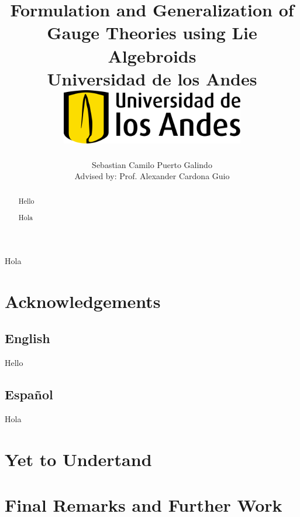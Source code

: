 \documentclass[12pt]{report}
\title 
{
	{Formulation and Generalization of Gauge Theories using Lie Algebroids}\\
	{\large Universidad de los Andes}\\
	\vspace{1.5cm}
	{\includegraphics[width = 0.6\textwidth]{logo.png}}	
}
\author{Sebastian Camilo Puerto Galindo\\[1cm]{\small Advised by: Prof. Alexander Cardona Guio}}
\newenvironment{dedication}
  {\clearpage           %
   \thispagestyle{empty}%
   \vspace*{\stretch{1}}%
   \raggedleft          %
  }
  {\par %
   \vspace{\stretch{3}} %
   \clearpage           %
  }
\theoremstyle{definition}
\begin{document}

\maketitle

\begin{dedication}
{\LARGE\calligra Hola}
\end{dedication}

\begin{abstract}
Hello
\end{abstract}

\begin{otherlanguage}{spanish}
\begin{abstract}
Hola
\end{abstract}
\end{otherlanguage}

\newpage

\chapter*{Acknowledgements}

\section*{English}
Hello
\begin{otherlanguage}{spanish}
\section*{Español}
Hola
\end{otherlanguage}

\tableofcontents


\chapter{Yet to Undertand}


\chapter{Final Remarks and Further Work}

\end{document}
